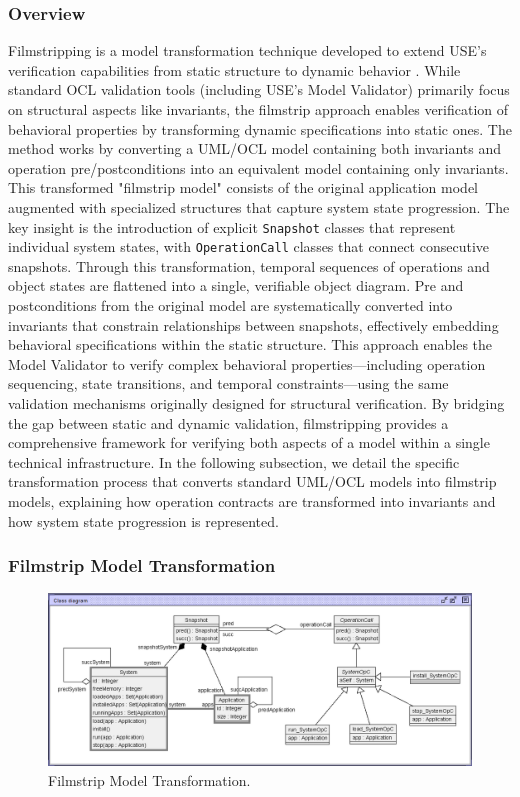 \subsubsection{Overview}
Filmstripping is a model transformation technique developed to extend USE's 
verification capabilities from static structure to dynamic behavior \cite{AM2Filmstrip} \cite{Filmstripping}. 
While standard OCL validation tools (including USE's Model Validator) primarily 
focus on structural aspects like invariants, the filmstrip approach enables 
verification of behavioral properties by transforming dynamic specifications into 
static ones. The method works by converting a UML/OCL model containing both invariants 
and operation pre/postconditions into an equivalent model containing only invariants. 
This transformed "filmstrip model" consists of the original application model 
augmented with specialized structures that capture system state progression. The 
key insight is the introduction of explicit \texttt{Snapshot} classes that represent 
individual system states, with \texttt{OperationCall} classes that connect 
consecutive snapshots. Through this transformation, temporal sequences of operations 
and object states are flattened into a single, verifiable object diagram. Pre and 
postconditions from the original model are systematically converted into invariants 
that constrain relationships between snapshots, effectively embedding behavioral 
specifications within the static structure. This approach enables the Model Validator 
to verify complex behavioral properties—including operation sequencing, state 
transitions, and temporal constraints—using the same validation mechanisms originally 
designed for structural verification. By bridging the gap between static and dynamic 
validation, filmstripping provides a comprehensive framework for verifying both 
aspects of a model within a single technical infrastructure. In the following 
subsection, we detail the specific transformation process that converts standard 
UML/OCL models into filmstrip models, explaining how operation contracts are 
transformed into invariants and how system state progression is represented.

\subsubsection{Filmstrip Model Transformation}

\begin{figure}
    \centering
    \includegraphics[width=1\textwidth]{figures/c1/SoftwareSystem/SS_Filmstrip_Gray_Edited.png}
    \caption{Filmstrip Model Transformation.}
    \label{fig:filmstrip_model}
\end{figure}

